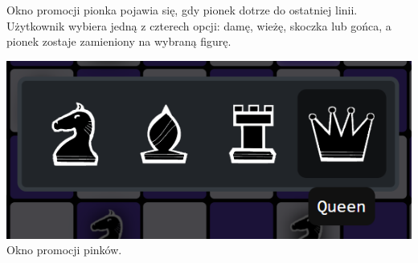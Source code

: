 \documentclass[12pt,a4paper]{article}
\begin{document}
\vspace{1cm}

\begin{minipage}[t]{0.55\textwidth} 
    \vspace{0pt} 
    \raggedright 
    Okno promocji pionka pojawia się, gdy pionek dotrze do ostatniej linii. Użytkownik wybiera jedną z czterech opcji: damę, wieżę, skoczka lub gońca, a pionek zostaje zamieniony na wybraną figurę.
\end{minipage} 
\hfill 
\begin{minipage}[t]{0.35\textwidth} 
    \vspace{0pt} 
    \centering 
    \includegraphics[width=\linewidth]{images/ins_min_prom.png} 
    Okno promocji pinków.
\end{minipage}

\vspace{1cm}
\end{document}
